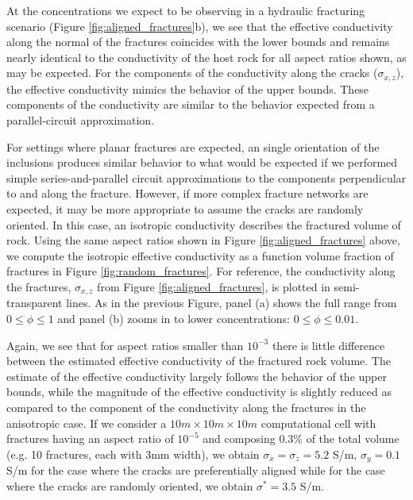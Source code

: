 At the concentrations we expect to be observing in a hydraulic fracturing scenario (Figure \ref{fig:aligned_fractures}b), we see that the effective conductivity along the normal of the fractures coincides with the lower bounds and remains nearly identical to the conductivity of the host rock for all aspect ratios shown, as may be expected. For the components of the conductivity along the cracks ($\sigma_{x, z}$), the effective conductivity mimics the behavior of the upper bounds. These components of the conductivity are similar to the behavior expected from a parallel-circuit approximation.

For settings where planar fractures are expected, an single orientation of the inclusions produces similar behavior to what would be expected if we performed simple series-and-parallel circuit approximations to the components perpendicular to and along the fracture. However, if more complex fracture networks are expected, it may be more appropriate to assume the cracks are randomly oriented. In this case, an isotropic conductivity describes the fractured volume of rock. Using the same aspect ratios shown in Figure \ref{fig:aligned_fractures} above, we compute the isotropic effective conductivity as a function volume fraction of fractures in Figure \ref{fig:random_fractures}. For reference, the conductivity along the fractures, $\sigma_{x, z}$ from Figure \ref{fig:aligned_fractures}, is plotted in semi-transparent lines. As in the previous Figure, panel (a) shows the full range from $0 \leq \phi \leq 1$ and panel (b) zooms in to lower concentrations: $0 \leq \phi \leq 0.01$.



Again, we see that for aspect ratios smaller than $10^{-3}$ there is little difference between the estimated effective conductivity of the fractured rock volume. The estimate of the effective conductivity largely follows the behavior of the upper bounds, while the magnitude of the effective conductivity is slightly reduced as compared to the component of the conductivity along the fractures in the anisotropic case. If we consider a $10m \times 10m \times 10m$ computational cell with fractures having an aspect ratio of $10^{-5}$ and composing 0.3\% of the total volume (e.g. 10 fractures, each with 3mm width), we obtain $\sigma_x = \sigma_z = 5.2$ S/m, $\sigma_y = 0.1$ S/m for the case where the cracks are preferentially aligned while for the case where the cracks are randomly oriented, we obtain $\sigma^* = 3.5$ S/m.

